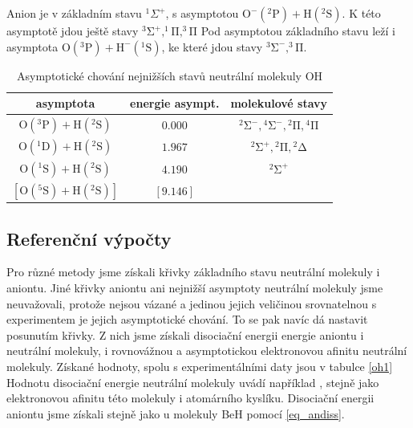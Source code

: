  Anion je v základním stavu $^1\Sigma^+$, s asymptotou
  $\mathrm{O^-}(^2\mathrm{P}) + \mathrm{H}(^2\mathrm{S})$. 
  K této asymptotě jdou ještě stavy
  $\mathrm{^3\Sigma^+,^1\Pi, ^3\Pi}$
 Pod asymptotou základního stavu leží i asymptota 
 $\mathrm{O}(^3\mathrm{P}) + \mathrm{H^-}(^1\mathrm{S})$, 
 ke které jdou stavy $\mathrm{^3\Sigma^-, ^3\Pi}$.

\begin{table}
\centering
\caption{Asymptotické chování nejnižších stavů neutrální molekuly OH}
\label{taOHas}
\bigskip
\begin{tabular}{ccc}
\toprule
asymptota & energie asympt. & molekulové stavy \\ 
\midrule
$\mathrm{O}(^3\mathrm{P}) + \mathrm{H}(^2\mathrm{S})$ & $0.000$ & $\mathrm{^2\Sigma^-}, \mathrm{^4\Sigma^-},\mathrm{^2\Pi},\mathrm{^4\Pi}$ \\ 
$\mathrm{O}(^1\mathrm{D}) + \mathrm{H}(^2\mathrm{S})$ & $1.967$ & $\mathrm{^2\Sigma^+}, \mathrm{^2\Pi}, \mathrm{^2\Delta}$ \\ 
$\mathrm{O}(^1\mathrm{S}) + \mathrm{H}(^2\mathrm{S})$ & $4.190$ & $ \mathrm{^2\Sigma^+}$ \\ 
$[\mathrm{O}(^5\mathrm{S}) + \mathrm{H}(^2\mathrm{S})]$ & $[9.146]$ \\ 
\bottomrule
\end{tabular} 
\end{table}

\subsection{Referenční výpočty}
Pro různé metody jsme získali křivky základního stavu neutrální molekuly i aniontu. Jiné křivky aniontu ani nejnižší asymptoty neutrální molekuly jsme neuvažovali, protože nejsou vázané a jedinou jejich veličinou srovnatelnou s experimentem je jejich asymptotické chování. To se pak navíc dá nastavit posunutím křivky.
Z nich jsme získali
disociační energii energie aniontu i neutrální molekuly, i rovnovážnou a asymptotickou 
elektronovou afinitu neutrální molekuly. Získané hodnoty, spolu s experimentálními daty 
jsou v tabulce \ref{oh1}
Hodnotu disociační energie neutrální molekuly uvádí například \cite{CRC_Handbook90}, 
stejně jako elektronovou afinitu této molekuly i atomárního kyslíku. Disociační energii 
aniontu jsme získali stejně jako u molekuly BeH pomocí \ref{eq_andiss}.

